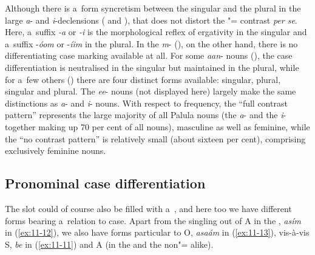 Although there is a~form syncretism between the  singular and the  plural in the large \textit{a}- and \textit{i}-declensions ( and ), that does not distort the "= contrast \textit{per se}. Here, a~suffix \textit{-a} or \textit{-i} is the morphological reflex of ergativity in the singular and a~suffix -\textit{óom} or -\textit{íim} in the plural. In the \textit{m}- (), on the other hand, there is no differentiating  case marking available at all. For some \textit{aan}- nouns (), the case differentiation is neutralised in the singular but maintained in the plural, while for a~few others () there are four distinct forms available:  singular,  plural,  singular and  plural. The \textit{ee}- nouns (not displayed here) largely make the same distinctions as \textit{a}- and \textit{i}- nouns. With respect to frequency, the ``full contrast pattern'' represents the large majority of all Palula nouns (the \textit{a}- and the \textit{i}- together making up 70 per cent of all nouns), masculine as well as feminine, while the ``no contrast pattern'' is relatively small (about sixteen per cent), comprising exclusively feminine nouns.



\subsection{Pronominal case differentiation}
\label{subsec:11-2-2}


The   slot could of course also be filled with a~, and here too we have different forms bearing a~relation to case. Apart from the singling out of A in the , \textit{asím} in (\ref{ex:11-12}), we also have  forms particular to O, \textit{asaám} in (\ref{ex:11-13}), vis-à-vis S, \textit{be} in (\ref{ex:11-11}) and A (in the  and the non"= alike).

